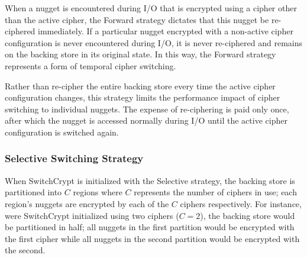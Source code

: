 When a nugget is encountered during I/O that is encrypted using a cipher other
than the active cipher, the Forward strategy dictates that this
nugget be re-ciphered immediately. If a particular nugget encrypted with a
non-active cipher configuration is never encountered during I/O, it is never
re-ciphered and remains on the backing store in its original state. In this way,
the Forward strategy represents a form of temporal cipher switching.

Rather than re-cipher the entire backing store every time the active cipher
configuration changes, this strategy limits the performance impact of cipher
switching to individual nuggets. The expense of re-ciphering is paid only once,
after which the nugget is accessed normally during I/O until the active cipher
configuration is switched again.


\subsubsection{Selective Switching Strategy}

When SwitchCrypt is initialized with the Selective strategy, the backing store
is partitioned into $C$ regions where $C$ represents the number of ciphers in
use; each region's nuggets are encrypted by each of the $C$ ciphers
respectively. For instance, were SwitchCrypt initialized using two ciphers ($C =
2$), the backing store would be partitioned in half; all nuggets in the first
partition would be encrypted with the first cipher while all nuggets in the
second partition would be encrypted with the second.

